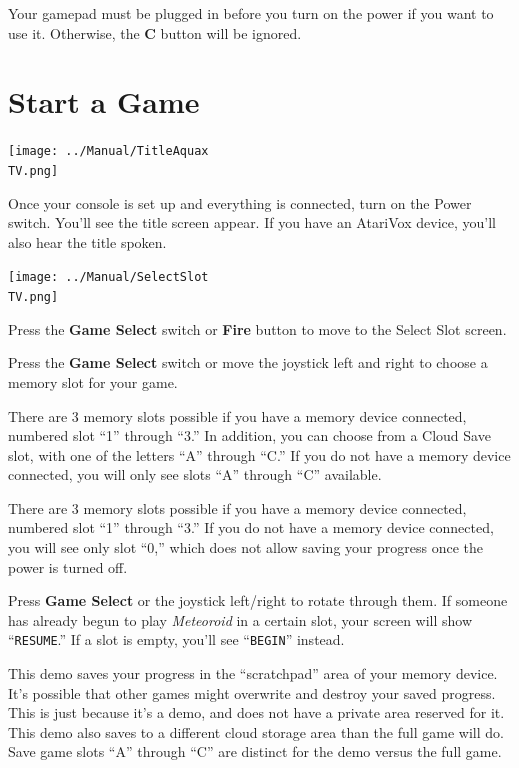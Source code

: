 \documentclass[10pt,twocolumn,openany,article]{memoir}
\newcommand\TV{NTSC}
\newcommand\TV{PAL}
\newcommand\TV{SECAM}
\begin{document}
Your gamepad must be plugged in before you turn on the power if you want
to use it. Otherwise, the \textbf{C} button will be ignored.

\section{Start a Game}

\begin{center}
  \texttt{[image: ../Manual/TitleAquax\\TV.png]}
\end{center}

Once your  console is set  up and everything  is connected, turn  on the
Power  switch. You'll  see  the  title screen  appear.  If  you have  an
AtariVox device, you'll also hear the title spoken.


\begin{center}
  \texttt{[image: ../Manual/SelectSlot\\TV.png]}
\end{center}

Press the \textbf{Game Select} switch or \textbf{Fire} button to move to
the Select Slot screen.

Press  the \textbf{Game  Select} switch  or move  the joystick  left and
right to choose a memory slot for your game. \ifdefined\PLUSCART

There are 3 memory slots possible if you have a memory device connected,
numbered  slot ``1''  through ``3.''  In addition,  you can  choose from
a Cloud Save slot,  with one of the letters ``A''  through ``C.'' If you
do not  have a memory  device connected, you  will only see  slots ``A''
through ``C'' available.

\else

There are 3 memory slots possible if you have a memory device connected,
numbered slot  ``1'' through ``3.'' If  you do not have  a memory device
connected, you  will see only  slot ``0,''  which does not  allow saving
your progress once the power is turned off.

\fi

Press \textbf{Game Select} or the  joystick left/right to rotate through
them.  If  someone  has  already begun  to  play  \textit{Meteoroid}  in
a certain slot, your screen will  show ``\texttt{RESUME}.'' If a slot is
empty, you'll see ``\texttt{BEGIN}'' instead.

\ifdefined\DEMO
\skip
This  demo  saves your  progress  in  the  ``scratchpad'' area  of  your
memory  device.  It's possible  that  other  games might  overwrite  and
destroy your saved progress. This is  just because it's a demo, and does
not have a private area reserved for it.
\ifdefined\PLUSCART
This demo  also saves to  a different cloud  storage area than  the full
game will do.  Save game slots ``A'' through ``C''  are distinct for the
demo versus the full game.
\fi
\skip
\fi
\end{document}
